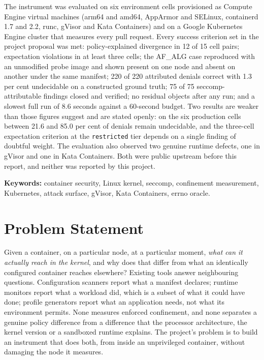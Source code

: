 The instrument was evaluated on six environment cells provisioned as Compute Engine virtual machines (arm64 and amd64, AppArmor and SELinux, containerd 1.7 and 2.2, runc, gVisor and Kata Containers) and on a Google Kubernetes Engine cluster that measures every pull request. Every success criterion set in the project proposal was met: policy-explained divergence in 12 of 15 cell pairs; expectation violations in at least three cells; the AF\_ALG case reproduced with an unmodified probe image and shown present on one node and absent on another under the same manifest; 220 of 220 attributed denials correct with 1.3 per cent undecidable on a constructed ground truth; 75 of 75 seccomp-attributable findings closed and verified; no residual objects after any run; and a slowest full run of 8.6 seconds against a 60-second budget. Two results are weaker than those figures suggest and are stated openly: on the six production cells between 21.6 and 85.0 per cent of denials remain undecidable, and the three-cell expectation criterion at the \texttt{restricted} tier depends on a single finding of doubtful weight. The evaluation also observed two genuine runtime defects, one in gVisor and one in Kata Containers. Both were public upstream before this report, and neither was reported by this project.

\noindent\textbf{Keywords:} container security, Linux kernel, seccomp, confinement measurement, Kubernetes, attack surface, gVisor, Kata Containers, errno oracle.

\section{Problem Statement}

Given a container, on a particular node, at a particular moment, \emph{what can it actually reach in the kernel}, and why does that differ from what an identically configured container reaches elsewhere? Existing tools answer neighbouring questions. Configuration scanners report what a manifest declares; runtime monitors report what a workload did, which is a subset of what it could have done; profile generators report what an application needs, not what its environment permits. None measures enforced confinement, and none separates a genuine policy difference from a difference that the processor architecture, the kernel version or a sandboxed runtime explains. The project's problem is to build an instrument that does both, from inside an unprivileged container, without damaging the node it measures.

